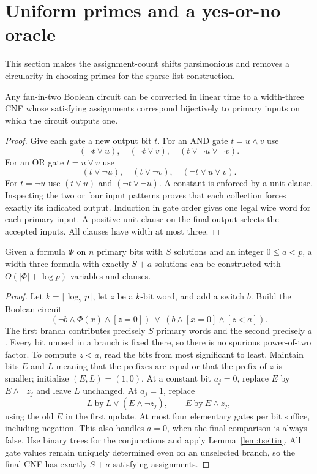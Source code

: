 \section{Uniform primes and a yes-or-no oracle}\label{sec:uniform}
This section makes the assignment-count shifts parsimonious and removes a circularity in choosing primes for the sparse-list construction.

\begin{lemma}\label{lem:tseitin}
Any fan-in-two Boolean circuit can be converted in linear time to a width-three CNF whose satisfying assignments correspond bijectively to primary inputs on which the circuit outputs one.
\end{lemma}
\begin{proof}
Give each gate a new output bit $t$. For an AND gate $t=u\wedge v$ use
\[
(\neg t\vee u),\quad(\neg t\vee v),\quad(t\vee\neg u\vee\neg v).
\]
For an OR gate $t=u\vee v$ use
\[
(t\vee\neg u),\quad(t\vee\neg v),\quad(\neg t\vee u\vee v).
\]
For $t=\neg u$ use $(t\vee u)$ and $(\neg t\vee\neg u)$. A constant is enforced by a unit clause. Inspecting the two or four input patterns proves that each collection forces exactly its indicated output. Induction in gate order gives one legal wire word for each primary input. A positive unit clause on the final output selects the accepted inputs. All clauses have width at most three.
\end{proof}

\begin{lemma}\label{lem:shift}
Given a formula $\Phi$ on $n$ primary bits with $S$ solutions and an integer $0\le a<p$, a width-three formula with exactly $S+a$ solutions can be constructed with $O(|\Phi|+\log p)$ variables and clauses.
\end{lemma}
\begin{proof}
Let $k=\lceil\log_2p\rceil$, let $z$ be a $k$-bit word, and add a switch $b$. Build the Boolean circuit
\[
(\neg b\wedge\Phi(x)\wedge[z=0])\ \vee\
(b\wedge[x=0]\wedge[z<a]).
\]
The first branch contributes precisely $S$ primary words and the second precisely $a$. Every bit unused in a branch is fixed there, so there is no spurious power-of-two factor. To compute $z<a$, read the bits from most significant to least. Maintain bits $E$ and $L$ meaning that the prefixes are equal or that the prefix of $z$ is smaller; initialize $(E,L)=(1,0)$. At a constant bit $a_j=0$, replace $E$ by $E\wedge\neg z_j$ and leave $L$ unchanged. At $a_j=1$, replace
\[
L\ \text{by}\ L\vee(E\wedge\neg z_j),\qquad
E\ \text{by}\ E\wedge z_j,
\]
using the old $E$ in the first update. At most four elementary gates per bit suffice, including negation. This also handles $a=0$, when the final comparison is always false. Use binary trees for the conjunctions and apply Lemma~\ref{lem:tseitin}. All gate values remain uniquely determined even on an unselected branch, so the final CNF has exactly $S+a$ satisfying assignments.
\end{proof}

